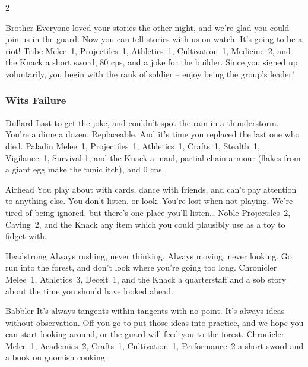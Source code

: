 \begin{multicols}{2}
\begin{itemize}
  {Brother}%
  {Everyone loved your stories the other night, and we're glad you could join us in the \gls{guard}.
  Now you can tell stories with us on watch.
  It's going to be a riot!
  }%
  {Tribe}%
  {Melee~1, Projectiles~1, Athletics~1, Cultivation~1, Medicine~2, and the Knack \guardian}%
  {a short sword, 80 \glspl{cp}, and a joke for the \gls{builder}.
  Since you signed up voluntarily, you begin with the rank of \gls{soldier} -- enjoy being the group's leader!}%

\end{itemize}

\needspace{10em}
\subsubsection{Wits Failure}
\begin{itemize}

  {Dullard}%
  {%
    Last to get the joke, and couldn't spot the rain in a thunderstorm.
    You're a dime a dozen.
    Replaceable.
    And it's time you replaced the last one who died.
  }%
  {Paladin}%
  {Melee~1, Projectiles~1, Athletics~1, Crafts~1, Stealth~1, Vigilance~1, Survival 1, and the Knack \lucky}%
  {a maul, partial chain armour (flakes from a giant egg make the tunic itch), and 0 \glspl{cp}.}%

  {Airhead}%
  {You play about with cards, dance with friends, and can't pay attention to anything else.
  You don't listen, or look.
  You're lost when not playing.
  We're tired of being ignored, but there's one place you'll listen\ldots
  }%
  {Noble}%
  {Projectiles~2, Caving~2, and the Knack \unstoppable}%
  {any item which you could plausibly use as a toy to fidget with.}%

  {Headstrong}%
  {Always rushing, never thinking.
  Always moving, never looking.
  Go run into the forest, and don't look where you're going too long.
  }%
  {Chronicler}%
  {Melee~1, Athletics~3, Deceit~1, and the Knack \charge}%
  {a quarterstaff and a sob story about the time you should have looked ahead.}%

  {Babbler}%
  {It's always tangents within tangents with no point.
  It's always ideas without observation.
  Off you go to put those ideas into practice, and we hope you can start looking around, or the \gls{guard} will feed you to the forest.
  }%
  {Chronicler}%
  {Melee~1, Academics~2, Crafts~1, Cultivation~1, Performance~2}%
  {a short sword and a book on gnomish cooking.}%


\end{itemize}
\end{multicols}
